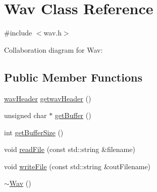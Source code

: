 \hypertarget{classWav}{}\section{Wav Class Reference}
\label{classWav}


{\ttfamily \#include $<$wav.\+h$>$}



Collaboration diagram for Wav\+:
\subsection*{Public Member Functions}
\begin{DoxyCompactItemize}
\item 
\hyperlink{structwavHeader}{wav\+Header} \hyperlink{classWav_a5e521ff6da3e7a3ed546d948a125847f}{getwav\+Header} ()
\item 
unsigned char $\ast$ \hyperlink{classWav_a2daf07a90ed34789e3a1874973d9bd36}{get\+Buffer} ()
\item 
int \hyperlink{classWav_a11de10cb698ea0ea08f3a28580f21b39}{get\+Buffer\+Size} ()
\item 
void \hyperlink{classWav_a8dbfa6c6dc4d8a0df92b0e4cb49d0133}{read\+File} (const std\+::string \&filename)
\item 
void \hyperlink{classWav_a3e4d48579d4c83afb0519ac8492af6d0}{write\+File} (const std\+::string \&out\+Filename)
\item 
\hyperlink{classWav_a1510b246ba121b103a60b8e7839af25f}{$\sim$\+Wav} ()
\end{DoxyCompactItemize}
